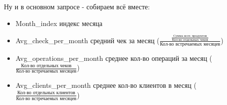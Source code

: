 \documentclass[12pt, a3paper]{article}
\begin{document}
Ну и в основном запросе - собираем всё вместе:
\begin{itemize}
    \item Month\_index индекс месяца
    \item Avg\_check\_per\_month средний чек за месяц 
    {\LARGE ($\frac{\frac{\text{Сумма всех продуктов}}{\text{Кол-во отдельных чеков}}}{\text{Кол-во встречаемых месяцев}}$)}
    \item Avg\_operations\_per\_month среднее кол-во операций за месяц {\LARGE ($\frac{\text{Кол-во отдельных чеков}}{\text{Кол-во встречаемых месяцев}}$)}
    \item Avg\_clients\_per\_month среднее кол-во клиентов в месяц {\LARGE ($\frac{\text{Кол-во отдельных клиентов}}{\text{Кол-во встречаемых месяцев}}$)}
\end{itemize}
\end{document}
